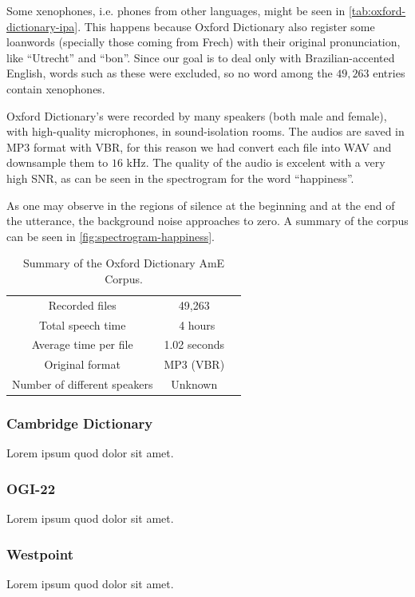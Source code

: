 Some xenophones, i.e. phones from other languages, might be seen in \autoref{tab:oxford-dictionary-ipa}. This happens because
Oxford Dictionary also register some loanwords (specially those coming from Frech) with their original pronunciation,
like ``Utrecht'' and ``bon''. Since our goal is to deal only with Brazilian-accented English, words such as these
were excluded, so no word among the $49,263$ entries contain xenophones.

Oxford Dictionary's were recorded by many speakers (both male and female), with high-quality microphones, in sound-isolation rooms.
The audios are saved in MP3 format with \ac{VBR}, for this reason we had convert each file into WAV and downsample them to $16$ kHz.
The quality of the audio is excelent with a very high \ac{SNR}, as can be seen in the spectrogram for the word ``happiness''.

As one may observe in the regions of silence at the beginning and at the end of the utterance, the background noise approaches to zero.
A summary of the corpus can be seen in \autoref{fig:spectrogram-happiness}.

\begin{table}[H]
\caption[Summary of the Oxford Dictionary AmE Corpus.]{Summary of the Oxford Dictionary AmE Corpus.}
\smallskip
\centering
\begin{tabular}{ccc} \toprule
  Recorded files & 49,263 \\
  Total speech time & ~4 hours \\
  Average time per file & 1.02 seconds \\
  Original format & MP3 (VBR) \\
  Number of different speakers & Unknown \\
  \bottomrule
\end{tabular}
\label{tab:oxford-summary}
\end{table}

\clearpage
\subsubsection{Cambridge Dictionary}
Lorem ipsum quod dolor sit amet.

\subsubsection{OGI-22}
Lorem ipsum quod dolor sit amet.

\subsubsection{Westpoint}
Lorem ipsum quod dolor sit amet.

